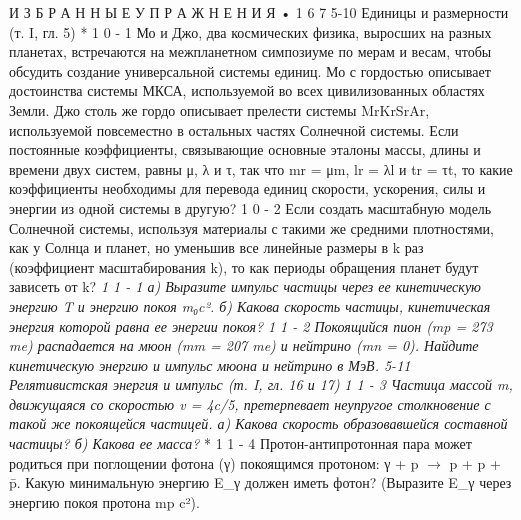 \documentclass[10pt,oneside]{article}
\begin{document}
И З Б Р А Н Н Ы Е  У П Р А Ж Н Е Н И Я • 1 6 7 5-10 Единицы и размерности (т. I, гл. 5) * 1 0 - 1 Мо и Джо, два космических физика, выросших на разных планетах, встречаются на межпланетном симпозиуме по мерам и весам, чтобы обсудить создание универсальной системы единиц. Мо с гордостью описывает достоинства системы МКСА, используемой во всех цивилизованных областях Земли. Джо столь же гордо описывает прелести системы MrKrSrAr, используемой повсеместно в остальных частях Солнечной системы. Если постоянные коэффициенты, связывающие основные эталоны массы, длины и времени двух систем, равны μ, λ и τ, так что mr = μm, lr = λl и tr = τt, то какие коэффициенты необходимы для перевода единиц скорости, ускорения, силы и энергии из одной системы в другую? \emph{ } 1 0 - 2 Если создать масштабную модель Солнечной системы, используя материалы с такими же средними плотностями, как у Солнца и планет, но уменьшив все линейные размеры в k раз (коэффициент масштабирования k), то как периоды обращения планет будут зависеть от k? \emph{ 1 1 - 1 а) Выразите импульс частицы через ее кинетическую энергию T и энергию покоя m₀c². б) Какова скорость частицы, кинетическая энергия которой равна ее энергии покоя? } \emph{ 1 1 - 2 Покоящийся пион (mp = 273 me) распадается на мюон (mm = 207 me) и нейтрино (mn = 0). Найдите кинетическую энергию и импульс мюона и нейтрино в МэВ. 5-11 Релятивистская энергия и импульс (т. I, гл. 16 и 17) } \emph{ 1 1 - 3 Частица массой m, движущаяся со скоростью v = 4c/5, претерпевает неупругое столкновение с такой же покоящейся частицей. а) Какова скорость образовавшейся составной частицы? б) Какова ее масса? } * 1 1 - 4 Протон-антипротонная пара может родиться при поглощении фотона (γ) покоящимся протоном: γ + p \ensuremath{\to} p + p + p̄. Какую минимальную энергию E\_γ должен иметь фотон? (Выразите E\_γ через энергию покоя протона mp c²).\par
\end{document}
